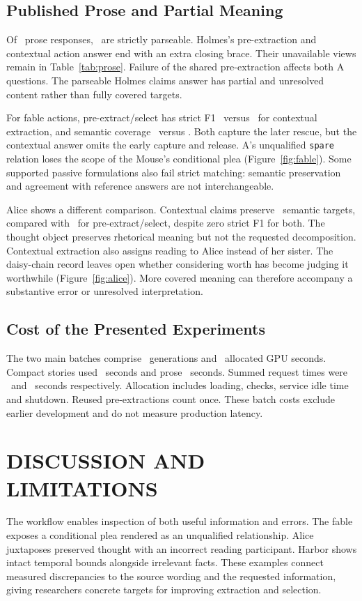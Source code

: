 \documentclass[a4paper,twoside]{article}
\begin{document}
\subsection{Published Prose and Partial Meaning}
\noindent Of \ProseCalls\ prose responses, \ProseParsed\ are strictly parseable. Holmes's pre-extraction and contextual action answer end with an extra closing brace. Their unavailable views remain in Table~\ref{tab:prose}. Failure of the shared pre-extraction affects both A questions. The parseable Holmes claims answer has partial and unresolved content rather than fully covered targets.



For fable actions, pre-extract/select has strict F1 \FableAFone\ versus \FableBFone\ for contextual extraction, and semantic coverage \FableACoverage\ versus \FableBCoverage. Both capture the later rescue, but the contextual answer omits the early capture and release. A's unqualified \texttt{spare} relation loses the scope of the Mouse's conditional plea (Figure~\ref{fig:fable}). Some supported passive formulations also fail strict matching: semantic preservation and agreement with reference answers are not interchangeable.

Alice shows a different comparison. Contextual claims preserve \AliceBCoverage\ semantic targets, compared with \AliceACoverage\ for pre-extract/select, despite zero strict F1 for both. The thought object preserves rhetorical meaning but not the requested decomposition. Contextual extraction also assigns reading to Alice instead of her sister. The daisy-chain record leaves open whether considering worth has become judging it worthwhile (Figure~\ref{fig:alice}). More covered meaning can therefore accompany a substantive error or unresolved interpretation.

\subsection{Cost of the Presented Experiments}
\noindent The two main batches comprise \MainCalls\ generations and \MainAllocation\ allocated GPU seconds. Compact stories used \CompactAllocation\ seconds and prose \ProseAllocation\ seconds. Summed request times were \CompactRequest\ and \ProseRequest\ seconds respectively. Allocation includes loading, checks, service idle time and shutdown. Reused pre-extractions count once. These batch costs exclude earlier development and do not measure production latency.

\section{\uppercase{Discussion and Limitations}}
\noindent The workflow enables inspection of both useful information and errors. The fable exposes a conditional plea rendered as an unqualified relationship. Alice juxtaposes preserved thought with an incorrect reading participant. Harbor shows intact temporal bounds alongside irrelevant facts. These examples connect measured discrepancies to the source wording and the requested information, giving researchers concrete targets for improving extraction and selection.
\end{document}
